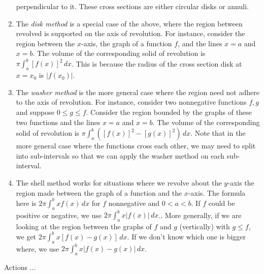 \documentclass[10pt]{amsart}
\begin{document}
\begin{enumerate}
  perpendicular to it. These cross sections are either circular disks
  or annuli.
\item The {\em disk method} is a special case of the above, where the
  region between revolved is supported on the axis of revolution. For
  instance, consider the region between the $x$-axis, the graph of a
  function $f$, and the lines $x = a$ and $x = b$. The volume of the
  corresponding solid of revolution is $\pi \int_a^b [f(x)]^2 \,
  dx$. This is because the radius of the cross section disk at $x=
  x_0$ is $|f(x_0)|$.
\item The {\em washer method} is the more general case where the
  region need not adhere to the axis of revolution. For instance,
  consider two nonnegative functions $f,g$ and suppose $0 \le g \le
  f$. Consider the region bounded by the graphs of these two functions
  and the lines $x = a$ and $x = b$. The volume of the corresponding
  solid of revolution is $\pi \int_a^b ([f(x)]^2 - [g(x)]^2) \,
  dx$. Note that in the more general case where the functions cross
  each other, we may need to split into sub-intervals so that we can
  apply the washer method on each sub-interval.
\item The shell method works for situations where we revolve about the
  $y$-axis the region made between the graph of a function and the
  $x$-axis. The formula here is $2\pi \int_a^b xf(x) \, dx$ for $f$
  nonnegative and $0 < a < b$. If $f$ could be positive or negative,
  we use $2 \pi \int_a^b x|f(x)| \, dx$.. More generally, if we are
  looking at the region between the graphs of $f$ and $g$ (vertically)
  with $g \le f$, we get $2\pi \int_a^b x[f(x) - g(x)] \, dx$. If we
  don't know which one is bigger where, we use $2\pi \int_a^b x|f(x) -
  g(x)| \, dx$.
\end{enumerate}

Actions ...
\end{document}
